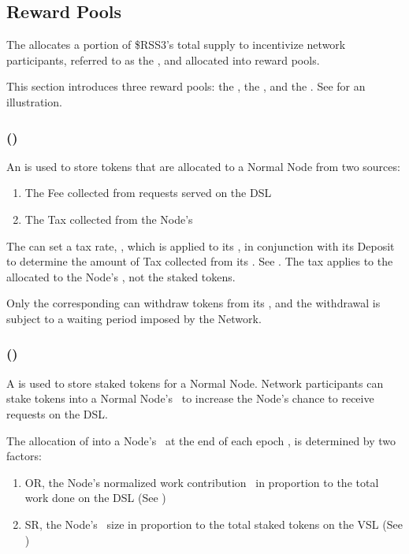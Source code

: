 \subsection{Reward Pools}
\label{subsec:reward_pools}

The  allocates a portion of \$RSS3's total supply to incentivize network participants, referred to as the ,
and allocated into reward pools.

This section introduces three reward pools: the , the , and the . See  for an illustration.

\subsubsection{ (\operationPool)}
\label{subsubsec:operation_pool}

An  is used to store tokens that are allocated to a Normal Node from two sources:
\begin{enumerate}
    \item The \gls{Fee} collected from requests served on the \gls{DSL}
    \item The \gls{Tax} collected from the Node's \stakingPool
\end{enumerate}

The  can set a tax rate, \taxRate, which is applied to its \stakingPool, in conjunction with its \gls{Deposit} to determine the amount of \gls{Tax} collected from its \stakingPool.
See .
The tax applies to the  allocated to the Node's \stakingPool, not the staked tokens.

Only the corresponding  can withdraw tokens from its \operationPool, and the withdrawal is subject to a waiting period imposed by the Network.

\subsubsection{ (\stakingPool)}
\label{subsubsec:staking_pool}

A  is used to store staked tokens for a Normal Node. Network participants can stake tokens into a Normal Node's \stakingPool\ to increase the Node's chance to receive requests on the \gls{DSL}.

The allocation of  into a Node's \stakingPool\ at the end of each epoch \epoch, is determined by two factors:
\begin{enumerate}
    \item \gls{OR}, the Node's normalized work contribution \work\ in proportion to the total work done on the \gls{DSL} (See )
    \item \gls{SR}, the Node's \stakingPool\ size in proportion to the total staked tokens on the \gls{VSL} (See )
\end{enumerate}

